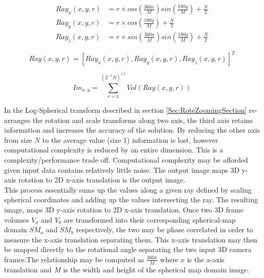 \begin{equation} \label{eqn:invLPFuncs}
\begin{split}
Ray_x(x,y,r) & = r \times cos\left(\frac{360x}{M}\right)sin\left(\frac{180y}{M}\right)  + \frac{N}{2} \\
Ray_y(x,y,r) & = r \times cos\left(\frac{180y}{M}\right) + \frac{N}{2} \\
Ray_z(x,y,r) & = r \times sin\left(\frac{360x}{M}\right)sin\left(\frac{180y}{M}\right) + \frac{N}{2}
\end{split}
\end{equation}

\begin{equation} \label{eqn:invLPVVF}
Ray(x,y,r) = [Ray_x(x,y,r), Ray_y(x,y,r), Ray_z(x,y,r)]^T
\end{equation}

\begin{equation} \label{eqn:smtUpdate}
Im_{x,y} = \sum_{r=1}^{(2^{-1}N)^{1.5}}{Vol(Ray(x,y,r))} 
\end{equation}

In the Log-Spherical transform described in section \ref{Sec:RoteZoomingSection} re-arranges the rotation and scale transforms along two axis, the third axis retains information and increases the accuracy of the solution. By reducing the other axis from size $N$ to the average value (size 1) information is lost, however computational complexity is reduced by an entire dimension. This is a complexity/performance trade off. Computational complexity may be afforded given input data contains relatively little noise. The output image maps 3D y-axis rotation to 2D x-axis translation is the output image. \\


This process essentially sums up the values along a given ray defined by scaling spherical coordinates and adding up the values intersecting the ray. The resulting image, maps 3D y-axis rotation to 2D x-axis translation. Once two 3D frame volumes $V_a$ and $V_b$ are transformed into their corresponding spherical-map domain $SM_a$ and $SM_b$ respectively, the two may be phase correlated  in order to measure the x-axis translation separating them. This x-axis translation may then be mapped directly to the rotational angle separating the two input 3D camera frames.The relationship may be computed as $\frac{360x}{M}$ where $x$ is the a-axis translation and $M$ is the width and height of the spherical map domain image. \\


